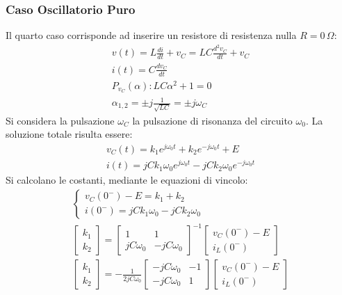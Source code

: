 \documentclass{article}
\numberwithin{equation}{subsection}
\begin{document}
\subsubsection{Caso Oscillatorio Puro}

Il quarto caso corrisponde ad inserire un resistore di resistenza nulla $R=0\,\Omega$:
\begin{gather*}
    v(t)=L\displaystyle\frac{di}{dt}+v_C=LC\frac{d^2v_C}{dt}+v_C\\
    i(t)=C\displaystyle\frac{dv_C}{dt}\\
    P_{v_C}(\alpha):LC\alpha^2+1=0\\
    \alpha_{1,2}=\displaystyle\pm j\frac{1}{\sqrt{LC}}=\pm j\omega_C
\end{gather*}
Si considera la pulsazione $\omega_C$ la pulsazione di risonanza del circuito $\omega_0$. 
La soluzione totale risulta essere:
\begin{gather*}
    v_C(t)=k_1e^{j\omega_0t}+k_2e^{-j\omega_0t}+E\\
    i(t)=jCk_1\omega_0e^{j\omega_0t}-jCk_2\omega_0e^{-j\omega_0t}
\end{gather*}
Si calcolano le costanti, mediante le equazioni di vincolo:
\begin{gather*}
    \begin{cases}
        v_C(0^-)-E=k_1+k_2\\
        i(0^-)=jCk_1\omega_0-jCk_2\omega_0
    \end{cases}\\
    \begin{bmatrix}
        k_1\\k_2
    \end{bmatrix}=
    \begin{bmatrix}
        1&1\\jC\omega_0&-jC\omega_0 
    \end{bmatrix}^{-1}
    \begin{bmatrix}
        v_C(0^-)-E\\i_L(0^-)
    \end{bmatrix}\\
    \begin{bmatrix}
        k_1\\k_2
    \end{bmatrix}=\displaystyle-\frac{1}{2jC\omega_0}
    \begin{bmatrix}
        -jC\omega_0&-1\\-jC\omega_0&1
    \end{bmatrix}
    \begin{bmatrix}
        v_C(0^-)-E\\i_L(0^-)
    \end{bmatrix}
\end{gather*}
\end{document}
